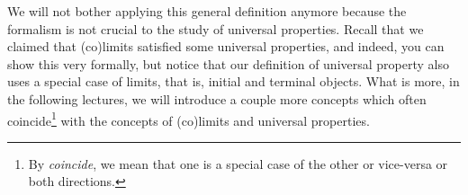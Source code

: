 \documentclass{article}
\theoremstyle{definition}
\theoremstyle{remark}
\begin{document}
We will not bother applying this general definition anymore because the formalism is not crucial to the study of universal properties. Recall that we claimed that (co)limits satisfied some universal properties, and indeed, you can show this very formally, but notice that our definition of universal property also uses a special case of limits, that is, initial and terminal objects. What is more, in the following lectures, we will introduce a couple  more concepts which often coincide\footnote{By \textit{coincide}, we mean that one is a special case of the other or vice-versa or both directions.} with the concepts of (co)limits and universal properties.
\end{document}
